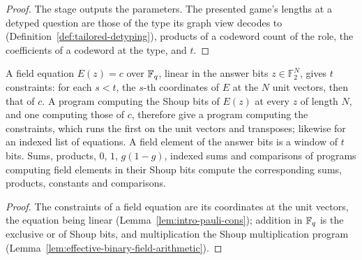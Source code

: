 \begin{proof}
\leanok
The stage outputs the parameters. The presented game's lengths at a detyped question are those
of the type its graph view decodes to (Definition~\ref{def:tailored-detyping}), products of a
codeword count of the role, the coefficients of a codeword at the type, and $t$.
\end{proof}

\begin{lemma}
\label{lem:ar-field-cons}
\leanok
A field equation $E(z) = c$ over $\mathbb{F}_q$, linear in the answer bits $z \in \mathbb{F}_2^N$, gives
$t$ constraints: for each $s < t$, the $s$-th coordinates of $E$ at the $N$ unit vectors, then
that of $c$. A program computing the Shoup bits of $E(z)$ at every $z$ of length $N$, and one
computing those of $c$, therefore give a program computing the constraints, which runs the first
on the unit vectors and transposes; likewise for an indexed list of equations. A field element
of the answer bits is a window of $t$ bits. Sums, products, $0$, $1$, $g (1 - g)$, indexed sums
and comparisons of programs computing field elements in their Shoup bits compute the
corresponding sums, products, constants and comparisons.
\end{lemma}

\begin{proof}
\leanok
The constraints of a field equation are its coordinates at the unit vectors, the equation being
linear (Lemma~\ref{lem:intro-pauli-cons}); addition in $\mathbb{F}_q$ is the exclusive or of Shoup bits,
and multiplication the Shoup multiplication program
(Lemma~\ref{lem:effective-binary-field-arithmetic}).
\end{proof}

